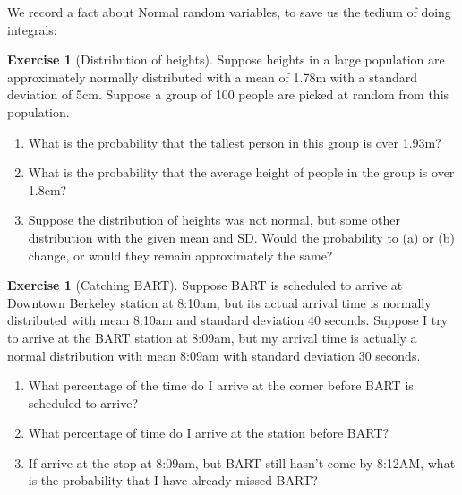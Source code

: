 \documentclass[11pt]{article}
\theoremstyle{definition}
\newtheorem{exercise}[]{Exercise}
\begin{document}
We record a fact about Normal random variables, to save
us the tedium of doing integrals:


\begin{exercise}[Distribution of heights]
Suppose heights in a large population are approximately
normally distributed with a mean of 1.78m with a standard
deviation of 5cm. Suppose a group of 100 people are picked
at random from this population.
\begin{enumerate}[label = (\alph*)]
  \item What is the probability that the tallest person in this group is over 1.93m?
  \item What is the probability that the average height
  of people in the group is over 1.8cm?
  \item Suppose the distribution of heights was not normal, but some other distribution with the given mean and SD. Would the probability to (a) or (b) change,
  or would they remain approximately the same?
\end{enumerate}

\end{exercise}

\begin{exercise}[Catching BART]
Suppose BART is scheduled to arrive at Downtown
Berkeley station at 8:10am, but its actual arrival time
is normally distributed with mean 8:10am and standard
deviation 40 seconds.
Suppose I try to arrive at the BART station at 8:09am, but
my arrival time is actually a normal distribution with mean
8:09am with standard deviation 30 seconds.
\begin{enumerate}[label = (\alph*)]
  \item What percentage of the time do I arrive at the
  corner before BART is scheduled to arrive?
  \item What percentage of time do I arrive
  at the station before BART?
  \item If arrive at the stop at 8:09am, but BART still
  hasn't come by 8:12AM, what is the probability that I have already missed BART?
\end{enumerate}

\end{exercise}
\end{document}
